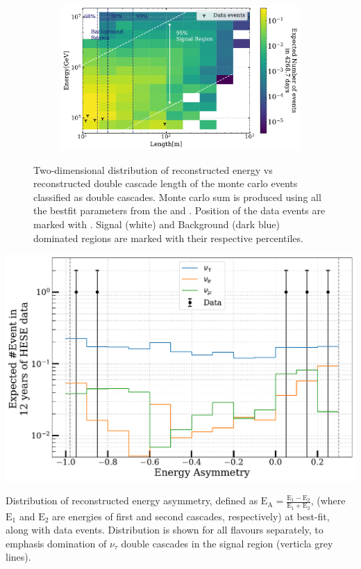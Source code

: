 \begin{figure}[h]
    \begin{subfigure}{0.8\textwidth}
        \includegraphics{./figures/results/DataMC_IC86_pass2_SnowStorm_v2_Bfr_DoubleCascadesLvsE_2D_withData.pdf}
    \end{subfigure}
    
    \caption{Two-dimensional distribution of reconstructed energy vs reconstructed double cascade length of the monte carlo events classified as double cascades. Monte carlo sum is produced using all the bestfit parameters from the  and . Position of the data events are marked with \wye[rotate=180]. Signal (white) and Background (dark blue) dominated regions are marked with their respective percentiles.}
\end{figure}

\begin{marginfigure}
    
    \includegraphics{./figures/results/Energy_ratio.pdf}
    
    \caption{Distribution of reconstructed energy asymmetry, defined as $\mathrm{E}_{\mathrm{A}}=\frac{\mathrm{E}_1-\mathrm{E}_2}{\mathrm{E}_1+\mathrm{E}_2}$, (where $\mathrm{E}_1$ and $\mathrm{E}_2$ are energies of first and second cascades, respectively) at best-fit, along with data events. Distribution is shown for all flavours separately, to emphasis domination of $\nu_{\tau}$ double cascades in the signal region (verticla grey lines).}
\end{marginfigure}

